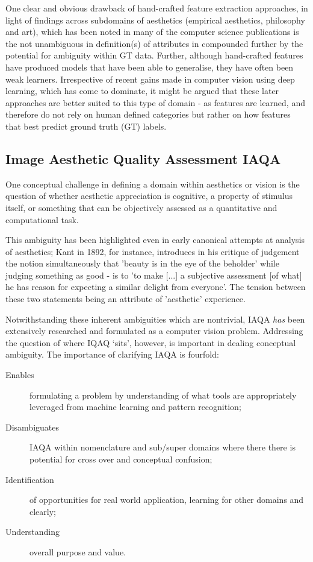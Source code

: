 \par One clear and obvious drawback of hand-crafted feature extraction approaches, in light of findings across subdomains of aesthetics (empirical aesthetics, philosophy and art), which has been noted in many of the computer science publications\cite{Zhang2021d,Ke2006,Kolesnikov2020,Lu2015b,Birkhoff1933a,Brielmann2018,DaSilva2017,Skov2019} is the not unambiguous in definition(s) of attributes in compounded further by the potential for ambiguity within GT data. Further, although hand-crafted features have produced models that have been able to generalise, they have often been weak learners. Irrespective of recent gains made in computer vision using deep learning, which has come to dominate\cite{Zhang2021d}, it might be argued that these later approaches are better suited to this type of domain - as features are learned, and therefore do not rely on human defined categories but rather on how features that best predict ground truth (GT) labels. 



\subsection{Image Aesthetic Quality Assessment IAQA}

One conceptual challenge in defining a domain within aesthetics or vision is the question of whether aesthetic appreciation is cognitive, a property of stimulus itself, or something that can be objectively assessed as a quantitative and computational task. 

\par This ambiguity has been highlighted even in early canonical attempts at analysis of aesthetics; Kant in 1892, for instance, introduces in his critique of judgement the notion simultaneously that 'beauty is in the eye of the beholder'\cite{Zhang2019} while judging something as good - is to 'to make [...] a subjective assessment [of what] he has reason for expecting a similar delight from everyone'\cite{Kant1892kant}. The tension between these two statements being an attribute of 'aesthetic' experience\cite{Spratt2015}.
\par
Notwithstanding these inherent ambiguities which are nontrivial, IAQA \textit{has} been extensively researched and formulated as a computer vision problem. Addressing the question of where IQAQ `sits', however, is important in dealing conceptual ambiguity. The importance of clarifying IAQA is fourfold:
\begin{description}
\item[Enables]formulating a problem by understanding of what tools are appropriately leveraged from machine learning and pattern recognition;
\item[Disambiguates] IAQA within nomenclature and sub/super domains where there there is potential for cross over and conceptual confusion; 
\item[Identification] of opportunities for real world application, learning for other domains and clearly;
\item[Understanding] overall purpose and value. 
\end{description}

